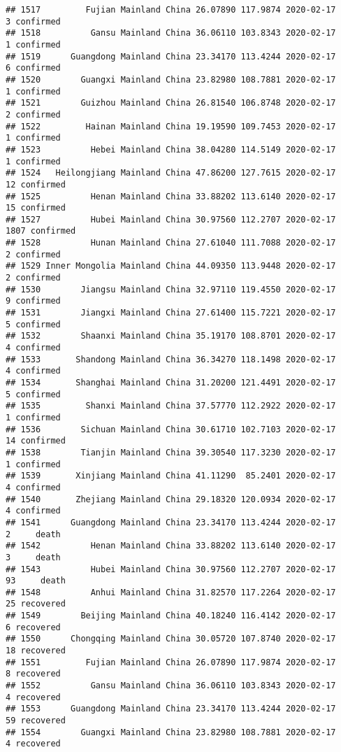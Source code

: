\documentclass[
]{article}
\begin{document}
\begin{verbatim}
## 1517         Fujian Mainland China 26.07890 117.9874 2020-02-17     3 confirmed
## 1518          Gansu Mainland China 36.06110 103.8343 2020-02-17     1 confirmed
## 1519      Guangdong Mainland China 23.34170 113.4244 2020-02-17     6 confirmed
## 1520        Guangxi Mainland China 23.82980 108.7881 2020-02-17     1 confirmed
## 1521        Guizhou Mainland China 26.81540 106.8748 2020-02-17     2 confirmed
## 1522         Hainan Mainland China 19.19590 109.7453 2020-02-17     1 confirmed
## 1523          Hebei Mainland China 38.04280 114.5149 2020-02-17     1 confirmed
## 1524   Heilongjiang Mainland China 47.86200 127.7615 2020-02-17    12 confirmed
## 1525          Henan Mainland China 33.88202 113.6140 2020-02-17    15 confirmed
## 1527          Hubei Mainland China 30.97560 112.2707 2020-02-17  1807 confirmed
## 1528          Hunan Mainland China 27.61040 111.7088 2020-02-17     2 confirmed
## 1529 Inner Mongolia Mainland China 44.09350 113.9448 2020-02-17     2 confirmed
## 1530        Jiangsu Mainland China 32.97110 119.4550 2020-02-17     9 confirmed
## 1531        Jiangxi Mainland China 27.61400 115.7221 2020-02-17     5 confirmed
## 1532        Shaanxi Mainland China 35.19170 108.8701 2020-02-17     4 confirmed
## 1533       Shandong Mainland China 36.34270 118.1498 2020-02-17     4 confirmed
## 1534       Shanghai Mainland China 31.20200 121.4491 2020-02-17     5 confirmed
## 1535         Shanxi Mainland China 37.57770 112.2922 2020-02-17     1 confirmed
## 1536        Sichuan Mainland China 30.61710 102.7103 2020-02-17    14 confirmed
## 1538        Tianjin Mainland China 39.30540 117.3230 2020-02-17     1 confirmed
## 1539       Xinjiang Mainland China 41.11290  85.2401 2020-02-17     4 confirmed
## 1540       Zhejiang Mainland China 29.18320 120.0934 2020-02-17     4 confirmed
## 1541      Guangdong Mainland China 23.34170 113.4244 2020-02-17     2     death
## 1542          Henan Mainland China 33.88202 113.6140 2020-02-17     3     death
## 1543          Hubei Mainland China 30.97560 112.2707 2020-02-17    93     death
## 1548          Anhui Mainland China 31.82570 117.2264 2020-02-17    25 recovered
## 1549        Beijing Mainland China 40.18240 116.4142 2020-02-17     6 recovered
## 1550      Chongqing Mainland China 30.05720 107.8740 2020-02-17    18 recovered
## 1551         Fujian Mainland China 26.07890 117.9874 2020-02-17     8 recovered
## 1552          Gansu Mainland China 36.06110 103.8343 2020-02-17     4 recovered
## 1553      Guangdong Mainland China 23.34170 113.4244 2020-02-17    59 recovered
## 1554        Guangxi Mainland China 23.82980 108.7881 2020-02-17     4 recovered

\end{verbatim}
\end{document}
